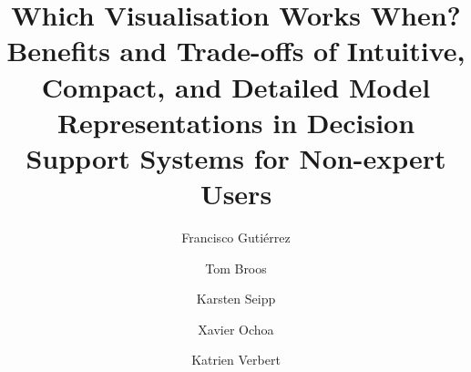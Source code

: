 \documentclass[final,5p,times,twocolumn,authoryear]{elsarticle}
\begin{document}
\begin{frontmatter}



\title{Which Visualisation Works When? Benefits and Trade-offs of Intuitive, Compact, and Detailed Model Representations in Decision Support Systems for Non-expert Users}


\author[label1]{Francisco Guti\'errez}
\author[label1]{Tom Broos}
\author[label1]{Karsten Seipp}

\author[label2]{Xavier Ochoa}
\author[label1]{Katrien Verbert}


\address[label1]{Departement Computerwetenschappen, KU Leuven, Leuven, Belgium}
\address[label2]{Escuela Superior Polit\'ecnica del Litoral (ESPOL), Ecuador}


\begin{abstract}


\end{abstract}
\end{frontmatter}
\end{document}
